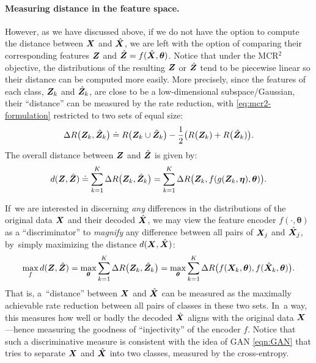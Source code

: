 \documentclass[\toplevelprefix/book-main.tex]{subfiles}
\begin{document}
{\paragraph{Measuring distance in the feature space.}
However, as we have discussed above, if we do not have the option to compute the distance between $\bm{X}$ and $\hat {\bm{X}}$, we are left with the option of comparing their corresponding features $\bm{Z}$ and $\hat {\bm{Z}} = f(\hat {\bm{X}}, \bm \theta)$. Notice that under the MCR$^2$ objective, the distributions of the resulting $\bm{Z}$ or $\hat {\bm{Z}}$ tend to be piecewise linear so  their distance can be  computed more easily. More precisely, since the features of each class, $\bm{Z}_k$ and $\hat{\bm{Z}}_k$, are close to be a low-dimensional subspace/Gaussian, their ``distance'' can be measured by the rate reduction, {with \eqref{eq:mcr2-formulation} restricted to two sets of equal size}:
\begin{equation}
\Delta R\big(\bm{Z}_k, \hat{\bm{Z}}_k\big) \doteq R\big(\bm{Z}_k \cup \hat{\bm{Z}}_k\big) - \frac{1}{2} \big( R\big(\bm{Z}_k) + R\big(\hat {\bm{Z}}_k)\big).
\end{equation}
The overall distance between $\bm{Z}$ and $\hat {\bm{Z}}$ is given by:
\begin{equation}
d(\bm{Z}, \hat {\bm{Z}}) \doteq   \sum_{k=1}^K \Delta R\big(\bm{Z}_k, \hat{\bm{Z}}_k\big) =  \sum_{k=1}^K \Delta R\big(\bm{Z}_k, f(g(\bm{Z}_k, \bm\eta),\bm \theta)\big).
\label{eqn:Z-distance}
\end{equation}


If~we are interested in discerning {\em any} differences in the distributions of the original data $\bm{X}$ and their decoded $\hat {\bm{X}}$, we may view the feature encoder $f(\cdot, \bm \theta)$ as a ``discriminator'' to {\em magnify} any difference between all pairs of $\bm{X}_j$ and $\hat {\bm{X}}_j$, by~simply maximizing the distance $d(\bm{X}, \hat {\bm{X}})$:
\begin{equation}
\max_f d(\bm{Z}, \hat {\bm{Z}}) = \max_{\bm \theta} \sum_{k=1}^K \Delta R\big(\bm{Z}_k, \hat{\bm{Z}}_k\big) = \max_{\bm \theta} \sum_{k=1}^K \Delta R\big(f(\bm{X}_k,\bm \theta), f(\hat{\bm{X}}_k,\bm \theta)\big).
    \label{eqn:max-distance}
\end{equation}
That is, a~``distance'' between $\bm{X}$ and $\hat {\bm{X}}$ can be measured as the maximally achievable rate reduction between all pairs of classes in these two sets. In~a way, this measures how well or badly the decoded $\hat {\bm{X}}$ aligns with the original data $\bm{X}$---hence measuring the goodness of ``injectivity'' of the encoder $f$. Notice that such a discriminative measure is consistent with the idea of GAN \eqref{eqn:GAN} that tries to separate $\bm{X}$ and $\hat {\bm{X}}$ into two classes, measured by the cross-entropy. 

}
\end{document}
